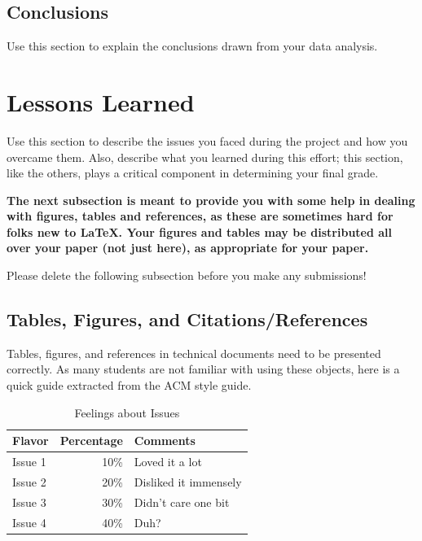 \documentclass[12pt]{article}
\begin{document}
    \subsection{Conclusions}
    Use this section to explain the conclusions drawn from your data analysis.\\
    \section{Lessons Learned}
    Use this section to describe the issues you faced during the project and how you overcame them. Also, describe what you learned during this effort; this section, like the others, plays a critical component in determining your final grade.\\

    {\bf The next subsection is meant to provide you with some help in
    dealing with figures, tables and references, as these are sometimes
    hard for folks new to \LaTeX. Your figures and tables
    may be distributed all over your paper (not just here), as appropriate for your paper.

    Please delete the following subsection before you make any submissions!}

    \subsection{Tables, Figures, and Citations/References}

    Tables, figures, and references in technical
    documents need to be presented correctly. As many students
    are not familiar with using these objects, here is a quick
    guide extracted from the ACM style guide.

    \begin{table}
        \centering
        \caption{Feelings about Issues}
        \label{SAMPLE TABLE}
        \begin{tabular}{|l|r|l|} \hline
        Flavor&Percentage&Comments\\ \hline
        Issue 1 &  10\% & Loved it a lot\\ \hline
        Issue 2 &  20\% & Disliked it immensely\\ \hline
        Issue 3 &  30\% & Didn't care one bit\\ \hline
        Issue 4 &  40\% & Duh?\\ \hline
        \end{tabular}
    \end{table}
\end{document}
